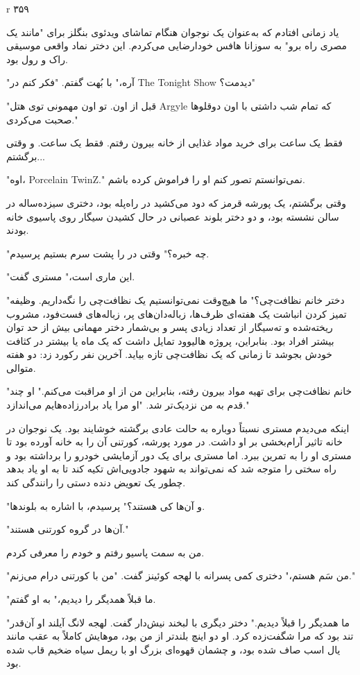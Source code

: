 r
۳۵۹

یاد زمانی افتادم که به‌عنوان یک نوجوان هنگام تماشای ویدئوی بنگلز برای "مانند یک مصری راه برو" به سوزانا هافس خود‌ارضایی می‌کردم. این دختر نماد واقعی موسیقی راک و رول بود.

"آره،" با بُهت گفتم. "فکر کنم در The Tonight Show دیدمت؟"

"قبل از اون. تو اون مهمونی توی هتل Argyle که تمام شب داشتی با اون دوقلوها صحبت می‌کردی."

فقط یک ساعت برای خرید مواد غذایی از خانه بیرون رفتم. فقط یک ساعت. و وقتی برگشتم...

"اوه، Porcelain TwinZ." نمی‌توانستم تصور کنم او را فراموش کرده باشم.

وقتی برگشتم، یک پورشه قرمز که دود می‌کشید در راه‌پله بود، دختری سیزده‌ساله در سالن نشسته بود، و دو دختر بلوند عصبانی در حال کشیدن سیگار روی پاسیوی خانه بودند.

"چه خبره؟" وقتی در را پشت سرم بستیم پرسیدم.

"این ماری است،" مستری گفت.

"دختر خانم نظافت‌چی؟" ما هیچ‌وقت نمی‌توانستیم یک نظافت‌چی را نگه‌داریم. وظیفه تمیز کردن انباشت یک هفته‌ای ظرف‌ها، زباله‌دان‌های پر، زباله‌های فست‌فود، مشروب ریخته‌شده و ته‌سیگار از تعداد زیادی پسر و بی‌شمار دختر مهمانی بیش از حد توان بیشتر افراد بود. بنابراین، پروژه هالیوود تمایل داشت که یک ماه یا بیشتر در کثافت خودش بجوشد تا زمانی که یک نظافت‌چی تازه بیاید. آخرین نفر رکورد زد: دو هفته متوالی.

"خانم نظافت‌چی برای تهیه مواد بیرون رفته، بنابراین من از او مراقبت می‌کنم." او چند قدم به من نزدیک‌تر شد. "او مرا یاد برادرزاده‌هایم می‌اندازد."

اینکه می‌دیدم مستری نسبتاً دوباره به حالت عادی برگشته خوشایند بود. یک نوجوان در خانه تاثیر آرام‌بخشی بر او داشت. در مورد پورشه، کورتنی آن را به خانه آورده بود تا مستری او را به تمرین ببرد. اما مستری برای یک دور آزمایشی خودرو را برداشته بود و راه سختی را متوجه شد که نمی‌تواند به شهود جادویی‌اش تکیه کند تا به او یاد بدهد چطور یک تعویض دنده دستی را رانندگی کند.

"و آن‌ها کی هستند؟" پرسیدم، با اشاره به بلوندها.

"آن‌ها در گروه کورتنی هستند."

من به سمت پاسیو رفتم و خودم را معرفی کردم.

"من سَم هستم،" دختری کمی پسرانه با لهجه کوئینز گفت. "من با کورتنی درام می‌زنم."

"ما قبلاً همدیگر را دیدیم،" به او گفتم.

"ما همدیگر را قبلاً دیدیم." دختر دیگری با لبخند نیش‌دار گفت. لهجه لانگ آیلند او آن‌قدر تند بود که مرا شگفت‌زده کرد. او دو اینچ بلندتر از من بود، موهایش کاملاً به عقب مانند یال اسب صاف شده بود، و چشمان قهوه‌ای بزرگ او با ریمل سیاه ضخیم قاب شده بود.

